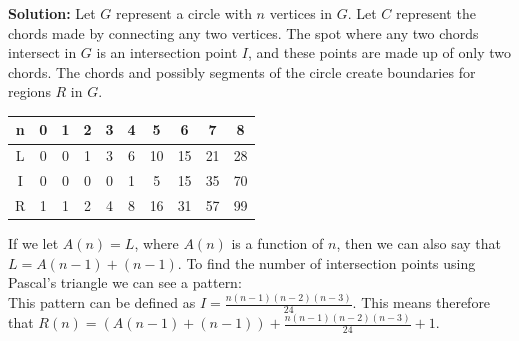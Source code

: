 \documentclass[10pt,a4paper]{report}
\begin{document}
	\noindent\textbf{Solution: }Let $G$ represent a circle with $n$ vertices in $G$.  Let $C$ represent the chords made by connecting any two vertices.  The spot where any two chords intersect in $G$ is an intersection point $I$, and these points are made up of only two chords.  The chords and possibly segments of the circle create boundaries for regions $R$ in $G$.\\
	
	\begin{center}\begin{tabular}{c|c c c c c c c c c}
	n & 0 & 1 & 2 & 3 & 4 & 5 & 6 & 7 & 8\\
\hline
\hline
	L & 0 & 0 & 1 & 3 & 6 & 10 & 15 & 21 & 28\\
	I & 0 & 0 & 0 & 0 & 1 & 5 & 15 & 35 & 70\\
	R & 1 & 1 & 2 & 4 & 8 & 16 & 31 & 57 & 99\\
\end{tabular}\end{center}

	\noindent If we let $A(n)=L$, where $A(n)$ is a function of $n$, then we can also say that $L=A(n-1)+(n-1)$.  To find the number of intersection points using Pascal's triangle we can see a pattern:\\
	
	\noindent This pattern can be defined as $I=\frac{n(n-1)(n-2)(n-3)}{24}$.  This means therefore that $R(n)=(A(n-1)+(n-1))+\frac{n(n-1)(n-2)(n-3)}{24}+1$.
	
\end{document}
